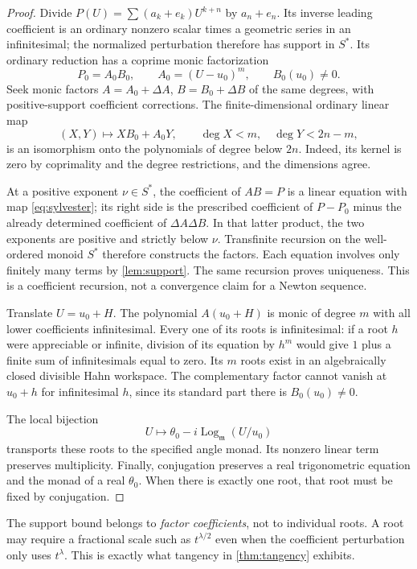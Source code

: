 \documentclass[11pt]{article}
\numberwithin{equation}{section}
\theoremstyle{definition}
\newcommand{\mm}{\mathfrak m}
\newcommand{\Logm}{\operatorname{Log}_{\mm}}
\begin{document}
\begin{proof}
Divide $P(U)=\sum(a_k+e_k)U^{k+n}$ by $a_n+e_n$. Its inverse leading coefficient is an ordinary nonzero scalar times a geometric series in an infinitesimal; the normalized perturbation therefore has support in $S^*$. Its ordinary reduction has a coprime monic factorization
\[
 P_0=A_0B_0,\qquad A_0=(U-u_0)^m,\qquad B_0(u_0)\ne0.
\]
Seek monic factors $A=A_0+\Delta A$, $B=B_0+\Delta B$ of the same degrees, with positive-support coefficient corrections. The finite-dimensional ordinary linear map
\begin{equation}\label{eq:sylvester}
 (X,Y)\longmapsto XB_0+A_0Y,
 \qquad \deg X<m,\quad \deg Y<2n-m,
\end{equation}
is an isomorphism onto the polynomials of degree below $2n$. Indeed, its kernel is zero by coprimality and the degree restrictions, and the dimensions agree.

At a positive exponent $\nu\in S^*$, the coefficient of $AB=P$ is a linear equation with map \eqref{eq:sylvester}; its right side is the prescribed coefficient of $P-P_0$ minus the already determined coefficient of $\Delta A\Delta B$. In that latter product, the two exponents are positive and strictly below $\nu$. Transfinite recursion on the well-ordered monoid $S^*$ therefore constructs the factors. Each equation involves only finitely many terms by \cref{lem:support}. The same recursion proves uniqueness. This is a coefficient recursion, not a convergence claim for a Newton sequence.

Translate $U=u_0+H$. The polynomial $A(u_0+H)$ is monic of degree $m$ with all lower coefficients infinitesimal. Every one of its roots is infinitesimal: if a root $h$ were appreciable or infinite, division of its equation by $h^m$ would give $1$ plus a finite sum of infinitesimals equal to zero. Its $m$ roots exist in an algebraically closed divisible Hahn workspace. The complementary factor cannot vanish at $u_0+h$ for infinitesimal $h$, since its standard part there is $B_0(u_0)\ne0$.

The local bijection
\[
 U\longmapsto \theta_0-i\Logm(U/u_0)
\]
transports these roots to the specified angle monad. Its nonzero linear term preserves multiplicity. Finally, conjugation preserves a real trigonometric equation and the monad of a real $\theta_0$. When there is exactly one root, that root must be fixed by conjugation.
\end{proof}

The support bound belongs to \emph{factor coefficients}, not to individual roots. A root may require a fractional scale such as $t^{\lambda/2}$ even when the coefficient perturbation only uses $t^\lambda$. This is exactly what tangency in \cref{thm:tangency} exhibits.
\end{document}
